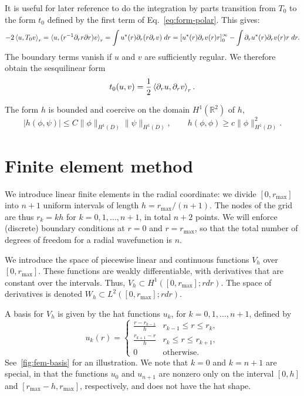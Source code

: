 \documentclass{article}
\newcommand{\RR}{\mathbb{R}}
\begin{document}
It is useful for later reference to do the integration by parts transition from $T_0$ to the form $t_0$ defined by the first term of Eq.~\eqref{eq:form-polar}. This gives:
\begin{equation}
-2\braket{u,T_0v}_r =  \braket{u, (r^{-1}\partial_r r\partial r) v}_r = \int u^*(r) \partial_r (r \partial_r v) \; dr = 
    \left[ u^*(r) \partial_r v(r) r  \right]_0^\infty - \int \partial_r u^*(r) \partial_r v(r) r \; dr.
\end{equation}
The boundary terms vanish if $u$ and $v$ are sufficiently regular. We therefore obtain the
sesquilinear form
\begin{equation}
    t_0(u,v) = \frac{1}{2}\braket{ \partial_r u, \partial_r v}_r.
\end{equation}

The form $h$ is bounded and coercive on the domain $H^1(\RR^2)$ of $h$,
\begin{equation}
    |h(\phi,\psi)| \leq C \|\phi\|_{H^1(D)} \|\psi\|_{H^1(D)}, \qquad h(\phi,\phi) \geq c \|\phi\|_{H^1(D)}^2.
\end{equation}

\section{Finite element method}

We introduce linear finite elements in the radial coordinate: we  divide $[0, r_\text{max}]$ into $n+1$ uniform intervals of length $h = r_\text{max}/(n+1)$. The nodes of the grid are thus $r_k = kh$ for $k=0,1,\ldots,n+1$, in total $n+2$ points. We will enforce (discrete) boundary conditions at $r=0$ and $r=r_\text{max}$, so that the total number of degrees of freedom for a radial wavefunction is $n$.

We introduce the space of piecewise linear and continuous functions $V_h$ over $[0, r_\text{max}]$. These functions are weakly differentiable, with derivatives that are constant over the intervals. Thus, $V_h \subset H^1([0,r_\text{max}];r dr)$. The space of derivatives is denoted $W_h \subset L^2([0,r_\text{max}]; r dr)$.

A basis for $V_h$ is given by the hat functions $u_k$, for $k=0,1,\ldots,n+1$, defined by
\begin{equation}
    u_k(r) = \begin{cases}
        \frac{r-r_{k-1}}{h} & r_{k-1} \leq r \leq r_k, \\
        \frac{r_{k+1}-r}{h} & r_k \leq r \leq r_{k+1}, \\
        0 & \text{otherwise}.
    \end{cases}
\end{equation}
See~\ref{fig:fem-basis} for an illustration.
We note that $k=0$ and $k=n+1$ are special, in that the functions $u_0$ and $u_{n+1}$ are nonzero only on the interval $[0,h]$ and $[r_\text{max}-h,r_\text{max}]$, respectively, and does not have the hat shape.
\end{document}
